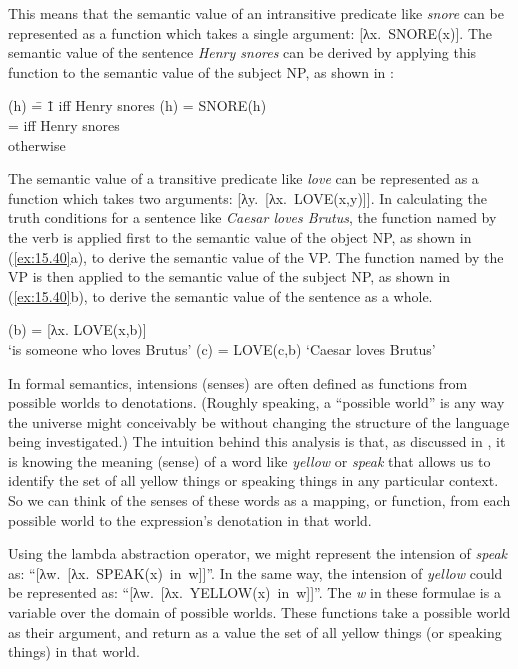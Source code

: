This means that the semantic value of an intransitive predicate like \textit{snore} can be represented as a function which takes a single argument: [λx.~SNORE(x)]. The semantic value of the sentence \textit{Henry snores} can be derived by applying this function to the semantic value of the subject NP, as shown in :


\ea \label{ex:15.39}
\begin{tabbing}\relax
[λx. SNORE(x)](h)  \= = \=  1 iff Henry snores \kill
[λx. SNORE(x)](h)  \> = \>  SNORE(h)\\
                   \> =  iff Henry snores\\
                   \>    otherwise
\end{tabbing}
\z


The semantic value of a transitive predicate like \textit{love} can be represented as a function which takes two arguments: [λy.~[λx.~LOVE(x,y)]]. In calculating the truth conditions for a sentence like \textit{Caesar loves Brutus}, the function named by the verb is applied first to the semantic value of the object NP, as shown in (\ref{ex:15.40}a), to derive the semantic value of the VP. The function named by the VP is then applied to the semantic value of the subject NP, as shown in (\ref{ex:15.40}b), to derive the semantic value of the sentence as a whole.


\ea \label{ex:15.40}
\ea  {[λy. [λx. LOVE(x,y)]]}(b) = [λx. LOVE(x,b)] \\
\hfill  ‘is someone who loves Brutus’
\ex  {[λx. LOVE(x,b)]}(c) =  LOVE(c,b) \hfill ‘Caesar loves Brutus’
\z \z


In formal semantics, intensions (senses) are often defined as functions from possible worlds to denotations. (Roughly speaking, a “possible world” is any way the universe might conceivably be without changing the structure of the language being investigated.) The intuition behind this analysis is that, as discussed in , it is knowing the meaning (sense) of a word like \textit{yellow} or \textit{speak} that allows us to identify the set of all yellow things or speaking things in any particular context. So we can think of the senses of these words as a mapping, or function, from each possible world to the expression’s denotation in that world.



Using the lambda abstraction operator, we might represent the intension of \textit{speak} as: “[λw.~[λx.~SPEAK(x)~in~w]]”. In the same way, the intension of \textit{yellow} could be represented as: “[λw.~[λx.~YELLOW(x)~in~w]]”. The \textit{w} in these formulae is a variable over the domain of possible worlds. These functions take a possible world as their argument, and return as a value the set of all yellow things (or speaking things) in that world.


